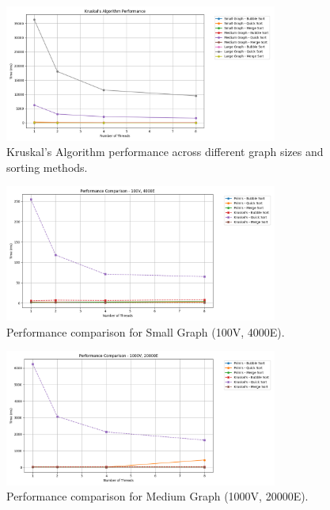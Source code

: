 \documentclass[11pt]{article}
\begin{document}
\begin{figure}[H]
    \centering
    \includegraphics[width=0.8\textwidth]{kruskals_comparison.png}
    \caption{Kruskal's Algorithm performance across different graph sizes and sorting methods.}
    \label{fig:kruskals_comparison}
\end{figure}

\begin{figure}[H]
    \centering
    \includegraphics[width=0.8\textwidth]{small_comparison.png}
    \caption{Performance comparison for Small Graph (100V, 4000E).}
    \label{fig:small_comparison}
\end{figure}

\begin{figure}[H]
    \centering
    \includegraphics[width=0.8\textwidth]{medium_comparison.png}
    \caption{Performance comparison for Medium Graph (1000V, 20000E).}
    \label{fig:medium_comparison}
\end{figure}
\end{document}
